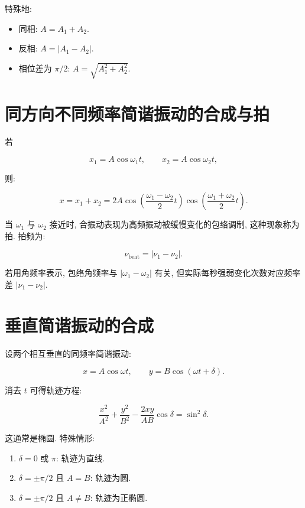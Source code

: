 \documentclass[
  a4paper,
]{ctexrep}
\providecommand{\tightlist}{%
  \setlength{\itemsep}{0pt}\setlength{\parskip}{0pt}}
\begin{document}
特殊地:

\begin{itemize}
\tightlist
\item
  同相: \(A=A_1+A_2\).
\item
  反相: \(A=|A_1-A_2|\).
\item
  相位差为 \(\pi/2\): \(A=\sqrt{A_1^2+A_2^2}\).
\end{itemize}

\section{同方向不同频率简谐振动的合成与拍}\label{ux540cux65b9ux5411ux4e0dux540cux9891ux7387ux7b80ux8c10ux632fux52a8ux7684ux5408ux6210ux4e0eux62cd}

若

\[
x_1=A\cos\omega_1t,
\qquad
x_2=A\cos\omega_2t,
\]

则:

\[
x=x_1+x_2=2A\cos\left(\frac{\omega_1-\omega_2}{2}t\right)
\cos\left(\frac{\omega_1+\omega_2}{2}t\right).
\]

当 \(\omega_1\) 与 \(\omega_2\) 接近时,
合振动表现为高频振动被缓慢变化的包络调制, 这种现象称为拍. 拍频为:

\[
\nu_{\mathrm{beat}}=|\nu_1-\nu_2|.
\]

若用角频率表示, 包络角频率与 \(|\omega_1-\omega_2|\) 有关,
但实际每秒强弱变化次数对应频率差 \(|\nu_1-\nu_2|\).

\section{垂直简谐振动的合成}\label{ux5782ux76f4ux7b80ux8c10ux632fux52a8ux7684ux5408ux6210}

设两个相互垂直的同频率简谐振动:

\[
x=A\cos\omega t,
\qquad
y=B\cos(\omega t+\delta).
\]

消去 \(t\) 可得轨迹方程:

\[
\frac{x^2}{A^2}+\frac{y^2}{B^2}-\frac{2xy}{AB}\cos\delta=\sin^2\delta.
\]

这通常是椭圆. 特殊情形:

\begin{enumerate}
\def\labelenumi{\arabic{enumi}.}
\tightlist
\item
  \(\delta=0\) 或 \(\pi\): 轨迹为直线.
\item
  \(\delta=\pm\pi/2\) 且 \(A=B\): 轨迹为圆.
\item
  \(\delta=\pm\pi/2\) 且 \(A\neq B\): 轨迹为正椭圆.
\end{enumerate}
\end{document}
